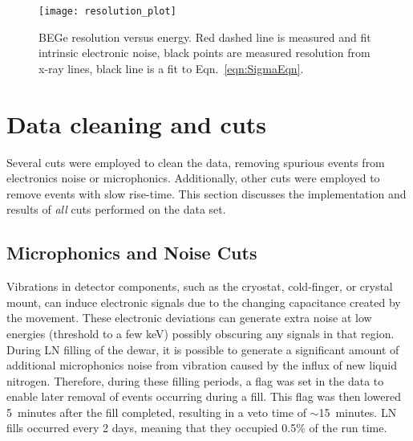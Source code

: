 			\begin{figure}
				\centering
				\texttt{[image: resolution\_plot]}
				\caption[BeGe resolution versus energy]
				{BEGe resolution versus energy.  Red dashed line is measured and fit intrinsic electronic noise, 
				black points are measured resolution from x-ray lines, black line is a fit to Eqn.~\ref{eqn:SigmaEqn}.}
				\label{fig:BeGeResPlot}
			\end{figure}





	\section{Data cleaning and cuts}
	\label{sec:BeGeCuts}	
	
	Several cuts were employed to clean the data, removing spurious events from electronics noise or microphonics.  Additionally, other cuts were employed to remove events with slow rise-time.  This section discusses the implementation and results of \emph{all} cuts performed on the data set.  
	
		\subsection{Microphonics and Noise Cuts}
	     	\label{sec:MicroCuts}	
	
	Vibrations in detector components, such as the cryostat, cold-finger, or crystal mount, can induce electronic signals due to the changing capacitance created by the movement.  These electronic deviations can generate extra noise at low energies (threshold to a few keV) possibly obscuring any signals in that region.  During LN filling of the dewar, it is possible to generate a significant amount of additional microphonics noise from vibration caused by the influx of new liquid nitrogen.  %
Therefore, during these filling periods, a flag was set in the data to enable later removal of events occurring during a fill.  This flag was then lowered 5~minutes after the fill completed, resulting in a veto time of $\sim$15~minutes.  LN fills occurred every 2 days, meaning that they occupied 0.5\% of the run time.  
		

